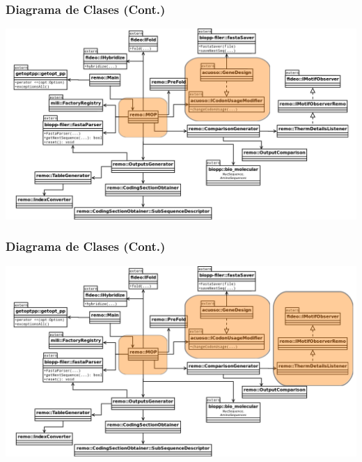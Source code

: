       \begin{frame}\frametitle{\textbf{Diagrama de Clases (Cont.)}}
        \begin{center}
          \includegraphics[scale=.25]{images/emptyClass3.png}
        \end{center}
      \end{frame}  

      \begin{frame}\frametitle{\textbf{Diagrama de Clases (Cont.)}}
        \begin{center}
          \includegraphics[scale=.25]{images/emptyClass4.png}
        \end{center}
      \end{frame}  

